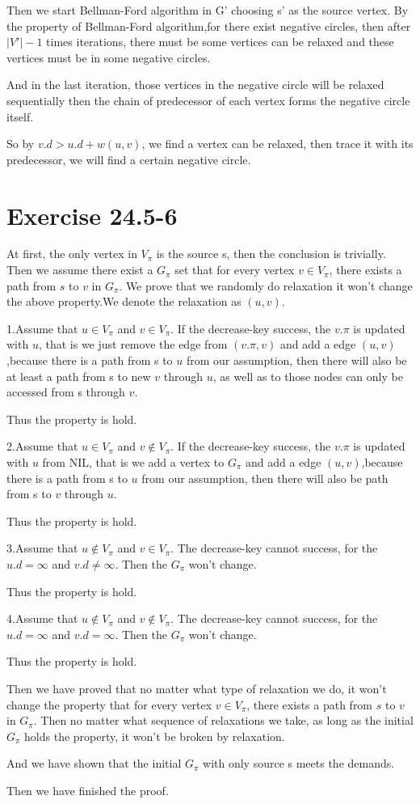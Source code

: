 \documentclass[oneside]{homework} %
\begin{document}
Then we start Bellman-Ford algorithm in G' choosing s' as the source vertex. By the property of Bellman-Ford algorithm,for there exist negative circles, then after $|V'|-1$ times iterations, there must be some vertices can be relaxed and these vertices must be in some negative circles. 

And in the last iteration, those vertices in the negative circle will be relaxed sequentially then the chain of predecessor of each vertex forms the negative circle itself.

So by $v.d > u.d + w(u,v)$, we find a vertex can be relaxed, then trace it with its predecessor, we will find a certain negative circle.

\section*{Exercise 24.5-6}
At first, the only vertex in $V_{\pi}$ is the source s, then the conclusion is trivially.
Then we assume there exist a $G_{\pi}$ set that for every vertex $v \in V_{\pi}$, there exists a path from $s$ to $v$ in $G_{\pi}$.
We prove that we randomly do relaxation it won't change the above property.We denote the relaxation as $(u,v)$. 

1.Assume that $u \in V_{\pi} $ and $v \in V_{\pi}$. If the decrease-key success, the $v.\pi$ is updated with $u$, that is we just remove the edge from $(v.\pi,v)$ and add a edge $(u,v)$,because there is a path from s to $u$ from our assumption, then there will also be at least a path from s to new $v$ through $u$, as well as to those nodes can only be accessed from s through $v$. 

Thus the property is hold.


2.Assume that $u \in V_{\pi} $ and $v \notin V_{\pi}$. If the decrease-key success, the $v.\pi$ is updated with $u$ from NIL, that is we add a vertex to $G_{\pi}$ and add a edge $(u,v)$,because there is a path from s to $u$ from our assumption, then there will also be path from s to $v$ through $u$. 

Thus the property is hold.

3.Assume that $u \notin V_{\pi} $ and $v \in V_{\pi}$. The decrease-key cannot success, for the $u.d = \infty$ and $v.d \neq \infty$. Then the $G_{\pi}$ won't change. 

Thus the property is hold.

4.Assume that $u \notin V_{\pi} $ and $v \notin V_{\pi}$.  The decrease-key cannot success, for the $u.d = \infty$ and $v.d = \infty$. Then the $G_{\pi}$ won't change. 

Thus the property is hold.

Then we have proved that no matter what type of relaxation we do, it won't change the property that for every vertex $v \in V_{\pi}$, there exists a path from $s$ to $v$ in $G_{\pi}$. Then no matter what sequence of relaxations we take, as long as the initial $G_{\pi}$ holds the property, it won't be broken by relaxation.

And we have shown that the initial $G_{\pi}$ with only source s meets the demands.

Then we have finished the proof.
\end{document}
